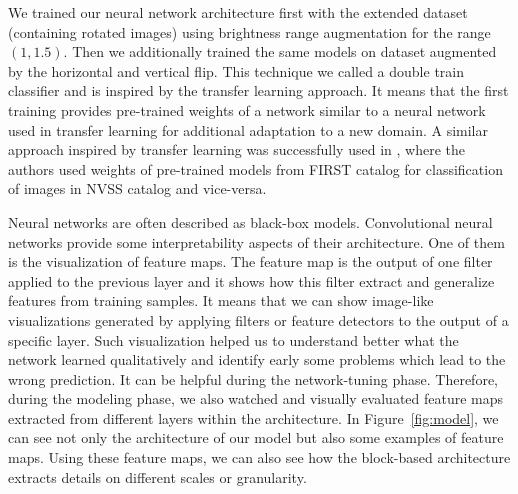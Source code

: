 \documentclass[fleqn,usenatbib]{mnras}
\begin{document}
We trained our neural network architecture first with the extended dataset (containing rotated images) using brightness range augmentation for the range $(1,1.5)$. Then we additionally trained the same models on dataset augmented by the horizontal and vertical flip. This technique we  called  a double train classifier and is inspired by the transfer learning approach. It means that the first training provides pre-trained weights of a network similar to a neural network used in transfer learning for additional adaptation to a new domain. A similar approach inspired by transfer learning was successfully used in \cite{1}, where the authors used weights of pre-trained models from FIRST catalog for classification of images in NVSS catalog and vice-versa.

Neural networks are often described as black-box models. Convolutional neural networks provide some interpretability aspects of their architecture. One of them is the visualization of feature maps. The feature map is the output of one filter applied to the previous layer and it shows how this filter extract and generalize features from training samples. It means that we can show image-like visualizations generated by applying filters or feature detectors to the output of a specific layer. Such visualization helped us to understand better what the network learned qualitatively and identify early some problems which lead to the wrong prediction. It can be helpful during the network-tuning phase. Therefore, during the modeling phase, we also watched and visually evaluated feature maps extracted from different layers within the architecture. In Figure~\ref{fig:model}, we can see not only the architecture of our model but also some examples of feature maps. Using these feature maps, we can also see how the block-based architecture extracts details on different scales or granularity. 
\end{document}
